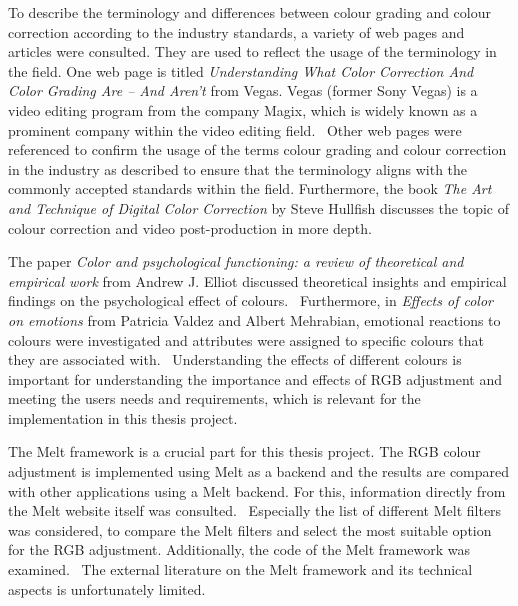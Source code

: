 \documentclass[../MasterThesis.tex]{subfiles}
\begin{document}
\begin{description}[font=\color{RedViolet!80!black}, style=nextline]
		To describe the terminology and differences between colour grading and colour correction according to the industry standards, a variety of web pages and articles were consulted. They are used to reflect the usage of the terminology in the field. 
		One web page is titled \textit{Understanding What Color Correction And Color Grading Are – And Aren’t} from Vegas. Vegas (former Sony Vegas) is a video editing program from the company Magix, which is widely known as a prominent company within the video editing field.~\cite{cc_cg_1}
		Other web pages were referenced to confirm the usage of the terms colour grading and colour correction in the industry as described to ensure that the terminology aligns with the commonly accepted standards within the field. 
		Furthermore, the book \textit{The Art and Technique of Digital Color Correction} by Steve Hullfish discusses the topic of colour correction and video post-production in more depth.~\cite{cc1}
		
		
		
		\item[Effects of different colour]
		
		
		The paper \textit{Color and psychological functioning: a review of theoretical and empirical work} from Andrew J. Elliot discussed theoretical insights and empirical findings on the psychological effect of colours.~\cite{colour}
		Furthermore, in \textit{Effects of color on emotions} from Patricia Valdez and Albert Mehrabian, emotional reactions to colours were investigated and attributes were assigned to specific colours that they are associated with.~\cite{colour2}
		Understanding the effects of different colours is important for understanding the importance and effects of RGB adjustment and meeting the users needs and requirements, which is relevant for the implementation in this thesis project.
		
	
		
		
		\item[Melt framework]
		
		
		The Melt framework is a crucial part for this thesis project. 
		The RGB colour adjustment is implemented using Melt as a backend and the results are compared with other applications using a Melt backend.
		For this, information directly from the Melt website itself was consulted.~\cite{melt} 
		Especially the list of different Melt filters was considered, to compare the Melt filters and select the most suitable option for the RGB adjustment.
		Additionally, the code of the Melt framework was examined.~\cite{melt_filters, melt_code} 
		The external literature on the Melt framework and its technical aspects is unfortunately limited.
		

\end{description}
\end{document}
